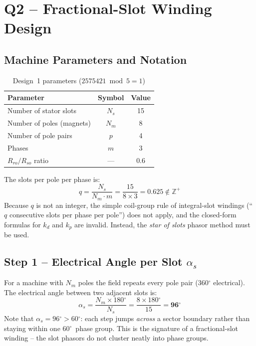 \documentclass[12pt,a4paper]{article}
\newcommand{\degree}{\ensuremath{^{\circ}}}
\begin{document}
\section{Q2 -- Fractional-Slot Winding Design}
\label{sec:q2}

\subsection{Machine Parameters and Notation}

\begin{table}[H]
  \centering
  \caption{Design~1 parameters ($2575421 \bmod 5 = 1$)}
  \label{tab:design1}
  \begin{tabular}{lcc}
    \toprule
    Parameter & Symbol & Value \\
    \midrule
    Number of stator slots    & $N_s$ & 15 \\
    Number of poles (magnets) & $N_m$ & 8  \\
    Number of pole pairs      & $p$   & 4  \\
    Phases                    & $m$   & 3  \\
    $R_{ro}/R_{so}$ ratio     & ---   & 0.6 \\
    \bottomrule
  \end{tabular}
\end{table}

\noindent The slots per pole per phase is:
\begin{equation}
  q = \frac{N_s}{N_m \cdot m} = \frac{15}{8 \times 3} = 0.625 \notin \mathbb{Z}^+
\end{equation}
Because $q$ is not an integer, the simple coil-group rule of integral-slot
windings (``$q$ consecutive slots per phase per pole'') does not apply,
and the closed-form formulas for $k_d$ and $k_p$ are invalid.
Instead, the \emph{star of slots} phasor method must be used.

\subsection{Step 1 -- Electrical Angle per Slot $\alpha_s$}

For a machine with $N_m$ poles the field repeats every pole pair
($360\degree$ electrical).
The electrical angle between two adjacent slots is:
\begin{equation}
  \boxed{\alpha_s = \frac{N_m \times 180\degree}{N_s}}
  = \frac{8 \times 180\degree}{15} = \mathbf{96\degree}
  \label{eq:alpha_s}
\end{equation}
Note that $\alpha_s = 96\degree > 60\degree$: each step jumps \emph{across}
a sector boundary rather than staying within one 60\degree\ phase group.
This is the signature of a fractional-slot winding -- the slot phasors do not
cluster neatly into phase groups.
\end{document}
